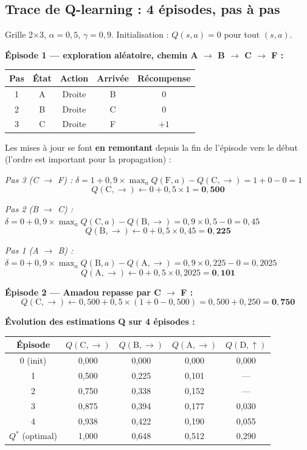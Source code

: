 \documentclass[11pt,a4paper]{article}
\begin{document}
\subsection{Trace de Q-learning : 4 épisodes, pas à pas}

Grille 2×3, $\alpha = 0{,}5$, $\gamma = 0{,}9$. Initialisation : $Q(s,a) = 0$ pour tout $(s,a)$.

\textbf{Épisode 1 --- exploration aléatoire, chemin A $\to$ B $\to$ C $\to$ F :}

\begin{center}
\begin{tabular}{ccccc}
\toprule
\textbf{Pas} & \textbf{État} & \textbf{Action} & \textbf{Arrivée} & \textbf{Récompense} \\
\midrule
1 & A & Droite & B & 0 \\
2 & B & Droite & C & 0 \\
3 & C & Droite & F & $+1$ \\
\bottomrule
\end{tabular}
\end{center}

Les mises à jour se font \textbf{en remontant} depuis la fin de l'épisode vers le début (l'ordre est important pour la propagation) :

\textit{Pas 3 (C $\to$ F) :} $\delta = 1 + 0{,}9 \times \max_a Q(\text{F},a) - Q(\text{C},\rightarrow) = 1 + 0 - 0 = 1$
$$Q(\text{C}, \rightarrow) \leftarrow 0 + 0{,}5 \times 1 = \mathbf{0{,}500}$$

\textit{Pas 2 (B $\to$ C) :} $\delta = 0 + 0{,}9 \times \max_a Q(\text{C},a) - Q(\text{B},\rightarrow) = 0{,}9\times 0{,}5 - 0 = 0{,}45$
$$Q(\text{B}, \rightarrow) \leftarrow 0 + 0{,}5 \times 0{,}45 = \mathbf{0{,}225}$$

\textit{Pas 1 (A $\to$ B) :} $\delta = 0 + 0{,}9 \times \max_a Q(\text{B},a) - Q(\text{A},\rightarrow) = 0{,}9\times 0{,}225 - 0 = 0{,}2025$
$$Q(\text{A}, \rightarrow) \leftarrow 0 + 0{,}5 \times 0{,}2025 = \mathbf{0{,}101}$$

\medskip
\textbf{Épisode 2 --- Amadou repasse par C $\to$ F :}
$$Q(\text{C}, \rightarrow) \leftarrow 0{,}500 + 0{,}5 \times (1 + 0 - 0{,}500) = 0{,}500 + 0{,}250 = \mathbf{0{,}750}$$

\textbf{Évolution des estimations Q sur 4 épisodes :}
\begin{center}
\begin{tabular}{ccccc}
\toprule
\textbf{Épisode} & $Q(\text{C},\rightarrow)$ & $Q(\text{B},\rightarrow)$ & $Q(\text{A},\rightarrow)$ & $Q(\text{D},\uparrow)$ \\
\midrule
0 (init) & 0{,}000 & 0{,}000 & 0{,}000 & 0{,}000 \\
1        & 0{,}500 & 0{,}225 & 0{,}101 & --- \\
2        & 0{,}750 & 0{,}338 & 0{,}152 & --- \\
3        & 0{,}875 & 0{,}394 & 0{,}177 & 0{,}030 \\
4        & 0{,}938 & 0{,}422 & 0{,}190 & 0{,}055 \\
\midrule
$Q^*$ (optimal) & 1{,}000 & 0{,}648 & 0{,}512 & 0{,}290 \\
\bottomrule
\end{tabular}
\end{center}
\end{document}
